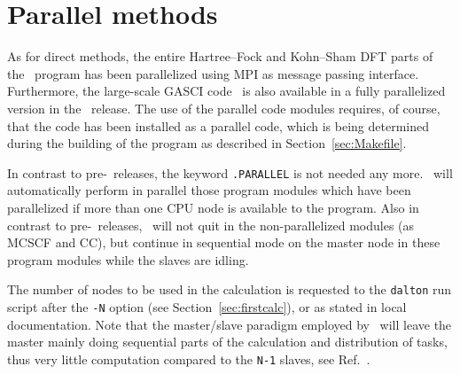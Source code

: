 \section{Parallel methods}\label{sec:parallel}

\begin{center}
\end{center}

As for direct methods, the entire Hartree--Fock and Kohn--Sham DFT parts of the \dalton\
program has been parallelized using MPI as
message passing interface.
Furthermore, the large-scale GASCI code \lucita\ 
is also available in a fully parallelized version in the \dalton\ release.
The use of the parallel code modules requires,
of course, that the code has been installed as a parallel
code\index{parallel calculation}, which is
being determined during the building of the program as described in
Section~\ref{sec:Makefile}.

In contrast to pre-\dalton\ releases, the keyword \verb|.PARALLEL| is not needed any more.
\dalton\ will automatically perform in parallel those program modules which have been
parallelized if more than one CPU node is available to the program.
Also in contrast to pre-\dalton\ releases, \dalton\ will not quit in the non-parallelized
modules (as MCSCF and CC), but continue in sequential mode on the master node in these
program modules while the slaves are idling.

%

The number of nodes to be used in the calculation is
requested to the 
\verb|dalton| run script after the \verb|-N| option (see
Section~\ref{sec:firstcalc}), or as stated in local
documentation. Note that the master/slave\index{master}
paradigm employed by 
\dalton\ will leave the master mainly doing sequential parts of the
calculation and distribution of tasks, thus very little computation
compared to the \verb|N-1| slaves, see
Ref.~\cite{pndjhapdkrthhkcpl253}.

